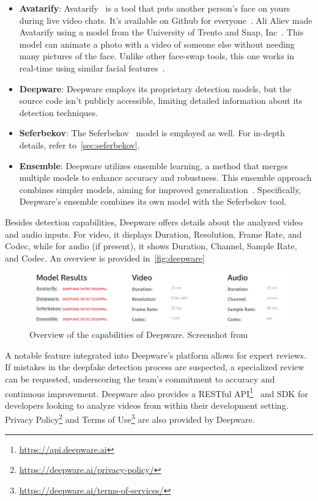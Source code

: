\begin{itemize}
	\item \textbf{Avatarify}: Avatarify~\cite{avatarify} is a tool that puts another person's
	      face on yours during live video chats. It's available on Github for everyone~\cite{avatarify-github}.
	      Ali Aliev made Avatarify using a model from the University of Trento and Snap, Inc~\cite{avatarify-vice,siarohin2020order}.
	      This model can animate a photo with a video of someone else without needing many
	      pictures of the face. Unlike other face-swap tools, this one works in real-time
	      using similar facial features~\cite{avatarify-thenextweb}.
	\item \textbf{Deepware}: Deepware employs its proprietary detection models, but the
	      source code isn't publicly accessible, limiting detailed information about
	      its detection techniques.
	\item \textbf{Seferbekov}: The Seferbekov~\cite{seferbekov-github} model is employed
	      as well. For in-depth details, refer to~\autoref{sec:seferbekov}.
	\item \textbf{Ensemble}: Deepware utilizes ensemble learning, a method that merges
	      multiple models to enhance accuracy and robustness. This ensemble approach
	      combines simpler models, aiming for improved generalization~\cite{giatsoglou2023investigation}. Specifically,
	      Deepware's ensemble combines its own model with the Seferbekov tool.
\end{itemize}

Besides detection capabilities, Deepware offers details about the analyzed video and audio
inputs. For video, it displays Duration, Resolution, Frame Rate, and Codec, while
for audio (if present), it shows Duration, Channel, Sample Rate, and Codec. An overview
is provided in~\autoref{fig:deepware}

\begin{figure}[htpb]
	\centering
	\includegraphics[scale=0.41]{figures/deepware}
	\caption{Overview of the capabilities of Deepware. Screenshot from~\cite{deepware-ai}}\label{fig:deepware}
\end{figure}

A notable feature integrated into Deepware's platform allows for expert
reviews. If mistakes in the deepfake detection process are suspected,
a specialized review can be requested, underscoring the team's commitment
to accuracy and continuous improvement. Deepware also provides a RESTful
\ac{API}\footnote{\url{https://api.deepware.ai}}~\cite{bernarddeepfake}
and \ac{SDK} for developers looking to analyze videos from within
their development setting. Privacy Policy\footnote{\url{https://deepware.ai/privacy-policy/}}
and Terms of Use\footnote{\url{https://deepware.ai/terms-of-services/}} are
also provided by Deepware.

